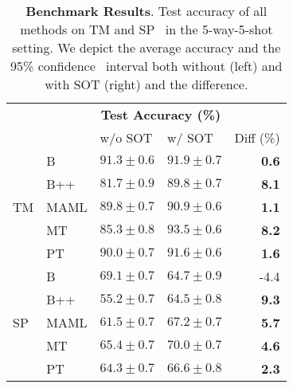\begin{table}[h]
\caption{\textbf{Benchmark Results}. Test accuracy of all methods on TM and SP     \ in the 5-way-5-shot setting. We depict the average accuracy and the 95\% confidence      \ interval both without (left) and with SOT (right) and the difference.}
\label{tab:tuned-benchmark}
\vspace{3.5pt}
\centering
\begin{tabular}{llllr}
\toprule
& & \multicolumn{2}{c}{\textbf{Test Accuracy (\%)}} &  \\
 &  & w/o SOT & w/ SOT & Diff (\%) \\
\midrule
\multirow[c]{5}{*}{TM} & B & $\mathbf{91.3 \pm 0.6}$ & $91.9 \pm 0.7$ & \bfseries \color{teal} 0.6 \\
 & B++ & $81.7 \pm 0.9$ & $89.8 \pm 0.7$ & \bfseries \color{teal} 8.1 \\
 & MAML & $89.8 \pm 0.7$ & $90.9 \pm 0.6$ & \bfseries \color{teal} 1.1 \\
 & MT & $85.3 \pm 0.8$ & $\mathbf{93.5 \pm 0.6}$ & \bfseries \color{teal} 8.2 \\
 & PT & $90.0 \pm 0.7$ & $91.6 \pm 0.6$ & \bfseries \color{teal} 1.6 \\
\midrule
\multirow[c]{5}{*}{SP} & B & $\mathbf{69.1 \pm 0.7}$ & $64.7 \pm 0.9$ & \color{red} -4.4 \\
 & B++ & $55.2 \pm 0.7$ & $64.5 \pm 0.8$ & \bfseries \color{teal} 9.3 \\
 & MAML & $61.5 \pm 0.7$ & $67.2 \pm 0.7$ & \bfseries \color{teal} 5.7 \\
 & MT & $65.4 \pm 0.7$ & $\mathbf{70.0 \pm 0.7}$ & \bfseries \color{teal} 4.6 \\
 & PT & $64.3 \pm 0.7$ & $66.6 \pm 0.8$ & \bfseries \color{teal} 2.3 \\
\bottomrule
\end{tabular}
\end{table}
